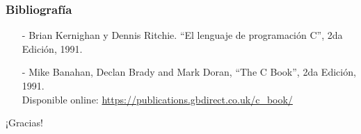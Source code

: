 \documentclass[aspectratio=169]{beamer}
\begin{document}
\begin{frame}[fragile]
    \frametitle{Bibliografía}
    \begin{itemize}
     \setlength\itemsep{0.5cm}
      \item[-] \small Brian Kernighan y Dennis Ritchie. “El lenguaje de programación C”, 2da Edición, 1991.\\
      \item[-] \small Mike Banahan, Declan Brady and Mark Doran, “The C Book”, 2da Edición, 1991.\\
      Disponible online: \url{https://publications.gbdirect.co.uk/c_book/}
    \end{itemize}
\end{frame}

\begin{frame}[plain]
    \begin{center}
    \vspace{2cm}
    \huge ¡Gracias!\\
    \vspace{2cm}
    \end{center}
\end{frame}
\end{document}
